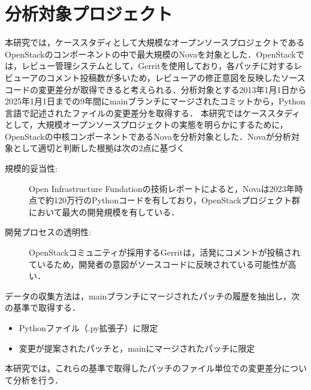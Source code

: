 \documentclass[11pt]{jreport}
\begin{document}
\section{分析対象プロジェクト}
本研究では，ケーススタディとして大規模なオープンソースプロジェクトであるOpenStackのコンポーネントの中で最大規模のNovaを対象とした．OpenStackでは，レビュー管理システムとして，Gerritを使用しており，各パッチに対するレビューアのコメント投稿数が多いため，レビューアの修正意図を反映したソースコードの変更差分が取得できると考えられる．分析対象とする2013年1月1日から2025年1月1日までの9年間にmainブランチにマージされたコミットから，Python言語で記述されたファイルの変更差分を取得する．
本研究ではケーススタディとして，大規模オープンソースプロジェクトの実態を明らかにするために，OpenStackの中核コンポーネントであるNovaを分析対象とした．Novaが分析対象として適切と判断した根拠は次の2点に基づく
\begin{description}
    \item[規模的妥当性:]Open Infrastructure Fundationの技術レポート\cite{openstack}によると，Novaは2023年時点で約120万行のPythonコードを有しており，OpenStackプロジェクト群において最大の開発規模を有している．
    \item[開発プロセスの透明性:]OpenStackコミュニティが採用するGerritは，活発にコメントが投稿されているため，開発者の意図がソースコードに反映されている可能性が高い．
\end{description}
データの収集方法は，mainブランチにマージされたパッチの履歴を抽出し，次の基準で取得する．
\begin{itemize}
    \item Pythonファイル（.py拡張子）に限定
    \item 変更が提案されたパッチと，mainにマージされたパッチに限定
\end{itemize}
本研究では，これらの基準で取得したパッチのファイル単位での変更差分について分析を行う．

\begin{table}[h]
    \centering
    \caption{データセットから抽出したコーディングパターン候補}
\end{table}
\end{document}
